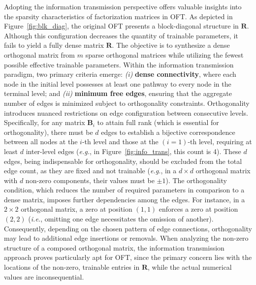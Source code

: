 Adopting the information transmission perspective offers valuable insights into the sparsity characteristics of factorization matrices in OFT. As depicted in Figure~\ref{fig:blk_diag}, the original OFT presents a block-diagonal structure in $\bm{R}$. Although this configuration decreases the quantity of trainable parameters, it fails to yield a fully dense matrix $\bm{R}$. The objective is to synthesize a dense orthogonal matrix from $m$ sparse orthogonal matrices while utilizing the fewest possible effective trainable parameters. Within the information transmission paradigm, two primary criteria emerge: \emph{(i)} \textbf{dense connectivity}, where each node in the initial level possesses at least one pathway to every node in the terminal level; and \emph{(ii)} \textbf{minimum free edges}, ensuring that the aggregate number of edges is minimized subject to orthogonality constraints. Orthogonality introduces nuanced restrictions on edge configuration between consecutive levels. Specifically, for any matrix $\bm{B}_i$ to attain full rank (which is essential for orthogonality), there must be $d$ edges to establish a bijective correspondence between all nodes at the $i$-th level and those at the $(i=1)$-th level, requiring at least $d$ inter-level edges (\emph{e.g.}, in Figure~\ref{fig:info_trans}, this count is 4). These $d$ edges, being indispensable for orthogonality, should be excluded from the total edge count, as they are fixed and not trainable (\emph{e.g.}, in a $d\times d$ orthogonal matrix with $d$ non-zero components, their values must be $\pm 1$). The orthogonality condition, which reduces the number of required parameters in comparison to a dense matrix, imposes further dependencies among the edges. For instance, in a $2\times 2$ orthogonal matrix, a zero at position $(1,1)$ enforces a zero at position $(2,2)$ (\emph{i.e.}, omitting one edge necessitates the omission of another). Consequently, depending on the chosen pattern of edge connections, orthogonality may lead to additional edge insertions or removals. When analyzing the non-zero structure of a composed orthogonal matrix, the information transmission approach proves particularly apt for OFT, since the primary concern lies with the locations of the non-zero, trainable entries in $\bm{R}$, while the actual numerical values are inconsequential.

